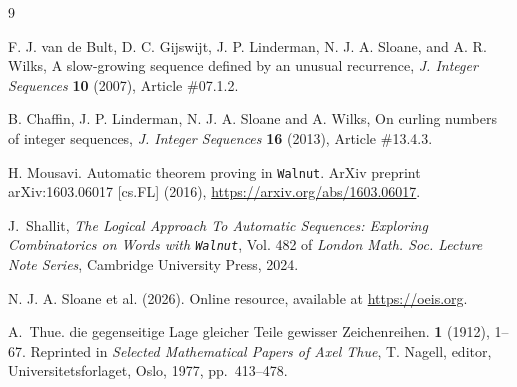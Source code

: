 \documentclass[12pt,reqno]{article}
\begin{document}
\begin{thebibliography}{9}

 F. J. van de Bult, D. C. Gijswijt, J. P. Linderman, N. J. A. Sloane, and A. R. Wilks, A slow-growing sequence defined by an unusual recurrence, {\it J. Integer Sequences} {\bf 10} (2007), Article \#07.1.2.

 B. Chaffin, J. P. Linderman, N. J. A. Sloane and A. Wilks, On curling numbers of integer sequences, {\it J. Integer Sequences} {\bf 16} (2013), Article \#13.4.3.

H. Mousavi. 
\newblock Automatic theorem proving in \texttt{{{Walnut}}}. 
\newblock ArXiv preprint 
arXiv:1603.06017 [cs.FL] (2016), \url{https://arxiv.org/abs/1603.06017}.

J.~Shallit, {\em The Logical Approach To Automatic Sequences: Exploring 
Combinatorics on Words with {\tt Walnut}}, Vol. 482 of {\em London Math. Soc. 
Lecture Note Series}, Cambridge University Press, 2024.

N. J. A. Sloane et al. 
 (2026). 
\newblock Online resource, available at \url{https://oeis.org}.

A.~Thue. 
 die gegenseitige {Lage} gleicher {Teile} gewisser 
{Zeichenreihen}. 
 {\bf 1} (1912), 1--67. 
\newblock Reprinted in {\it Selected Mathematical Papers of Axel Thue}, T. 
Nagell, editor, Universitetsforlaget, Oslo, 1977, pp.~413--478.

\end{thebibliography}
\end{document}
